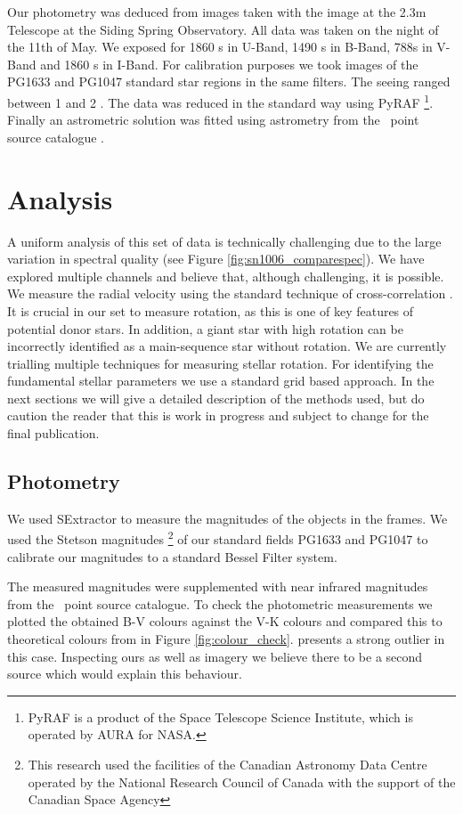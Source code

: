 Our photometry was deduced from images taken with the image at the 2.3m Telescope at the Siding Spring Observatory. All data was taken on the night of the 11th of May. We exposed for 1860 s in U-Band, 1490 s in B-Band, 788s in V-Band and 1860 s in I-Band. For calibration purposes we took images of the PG1633 and PG1047 standard star regions in the same filters. The seeing ranged between 1 and 2 \arcsec. 
The data was reduced in the standard way using PyRAF \footnote{PyRAF is a product of the Space Telescope Science Institute, which is operated by AURA for NASA.}.
Finally an astrometric solution was fitted using astrometry from the \twomass\ point source catalogue \citep{2006AJ....131.1163S}. 


\section{Analysis}

A uniform analysis of this set of data is technically challenging due to the large variation in spectral quality (see Figure \ref{fig:sn1006_comparespec}). We have explored multiple channels and believe that, although challenging, it is possible. We measure the radial velocity using the standard technique of cross-correlation \citep{1979AJ.....84.1511T}. 
It is crucial in our set to measure rotation, as this is one of key features of potential donor stars. In addition, a giant star with high rotation can be incorrectly identified as a main-sequence star without rotation. We are currently trialling multiple techniques for measuring stellar rotation. For identifying the fundamental stellar parameters we use a standard grid based approach. In the next sections we will give a detailed description of the methods used, but do caution the reader that this is work in progress and subject to change for the final publication.

\subsection{Photometry}
We used SExtractor \citep{1996A&AS..117..393B} to measure the magnitudes of the objects in the frames. We used the Stetson magnitudes \footnote{This research used the facilities of the Canadian Astronomy Data Centre operated by the National Research Council of Canada with the support of the Canadian Space Agency}  of our standard fields PG1633 and PG1047 to calibrate our magnitudes to a standard Bessel Filter system. 

The measured magnitudes were supplemented with near infrared magnitudes from the \twomass\ point source catalogue.
To check the photometric measurements we plotted the obtained B-V colours against the V-K colours and compared this to theoretical colours from \citep{2010A&A...512A..54C} in Figure \ref{fig:colour_check}.   presents a strong outlier in this case. Inspecting ours as well as \twomass imagery we believe there to be a second source which would explain this behaviour. 

